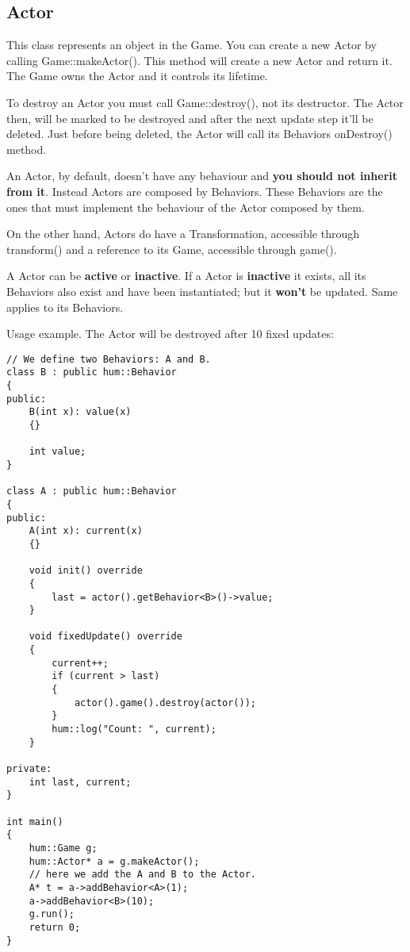 \subsection{Actor}

This class represents an object in the Game. You can create a new Actor by calling
Game::makeActor(). This method will create a new Actor and return it. The Game owns
the Actor and it controls its lifetime.

To destroy an Actor you must call Game::destroy(), not its destructor.
The Actor then, will be marked to be destroyed and after the next update step
it'll be deleted. Just before being deleted, the Actor will call its
Behaviors onDestroy() method.

An Actor, by default, doesn't have any behaviour and \textbf{you should not inherit
from it}.  Instead Actors are composed by Behaviors. These Behaviors are
the ones that must implement the behaviour of the Actor composed by them.

On the other hand, Actors do have a Transformation, accessible through transform()
and a reference to its Game, accessible through game().

A Actor can be \textbf{active} or \textbf{inactive}. If a Actor is \textbf{inactive} it exists,
all its Behaviors also exist and have been instantiated; but it \textbf{won't}
be updated. Same applies to its Behaviors.

Usage example. The Actor will be destroyed after 10 fixed updates:
\begin{lstlisting}[caption=Actor example]
// We define two Behaviors: A and B.
class B : public hum::Behavior
{
public:
    B(int x): value(x)
    {}

    int value;
}

class A : public hum::Behavior
{
public:
    A(int x): current(x)
    {}

    void init() override
    {
        last = actor().getBehavior<B>()->value;
    }

    void fixedUpdate() override
    {
        current++;
        if (current > last)
        {
            actor().game().destroy(actor());
        }
        hum::log("Count: ", current);
    }

private:
    int last, current;
}

int main()
{
    hum::Game g;
    hum::Actor* a = g.makeActor();
    // here we add the A and B to the Actor.
    A* t = a->addBehavior<A>(1);
    a->addBehavior<B>(10);
    g.run();
    return 0;
}
\end{lstlisting}

